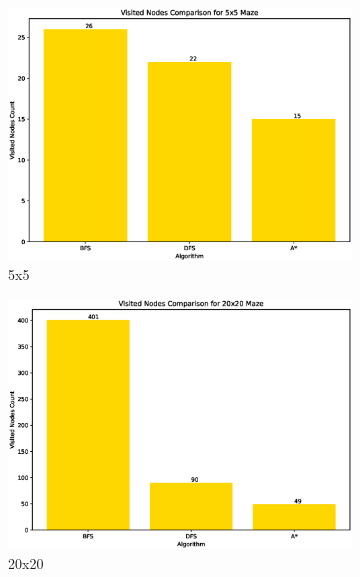 \documentclass{article}
\begin{document}
\begin{figure}[htbp]
    \centering
    \begin{subfigure}[b]{0.45\textwidth}
        \centering
        \includegraphics[width=\textwidth]{imgs/Visited-5-5.eps}
        \caption{5x5}
    \end{subfigure}
    \begin{subfigure}[b]{0.45\textwidth}
        \centering
        \includegraphics[width=\textwidth]{imgs/Visited-20-20.eps}
        \caption{20x20}
    \end{subfigure}
    \newline
    \begin{subfigure}[b]{0.45\textwidth}
        \centering

\end{subfigure}
\end{figure}
\end{document}
